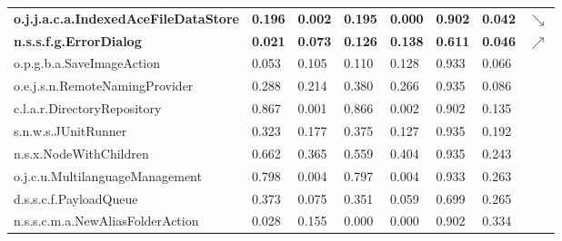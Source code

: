 \begin{tabular}{llllllll}
\multicolumn{1}{l|}{\textbf{o.j.j.a.c.a.IndexedAceFileDataStore}}           & \textbf{0.196} & \multicolumn{1}{l|}{\textbf{0.002}} & \textbf{0.195} & \multicolumn{1}{l|}{\textbf{0.000}} & \textbf{0.902} & \textbf{0.042} & $\searrow$\\
\multicolumn{1}{l|}{\textbf{n.s.s.f.g.ErrorDialog}}                         & \textbf{0.021} & \multicolumn{1}{l|}{\textbf{0.073}} & \textbf{0.126} & \multicolumn{1}{l|}{\textbf{0.138}} & \textbf{0.611} & \textbf{0.046} & $\nearrow$\\
\multicolumn{1}{l|}{o.p.g.b.a.SaveImageAction}                              & 0.053          & \multicolumn{1}{l|}{0.105}          & 0.110          & \multicolumn{1}{l|}{0.128}          & 0.933          & 0.066          & \\
\multicolumn{1}{l|}{o.e.j.s.n.RemoteNamingProvider}                         & 0.288          & \multicolumn{1}{l|}{0.214}          & 0.380          & \multicolumn{1}{l|}{0.266}          & 0.935          & 0.086          & \\
\multicolumn{1}{l|}{c.l.a.r.DirectoryRepository}                            & 0.867          & \multicolumn{1}{l|}{0.001}          & 0.866          & \multicolumn{1}{l|}{0.002}          & 0.902          & 0.135          & \\
\multicolumn{1}{l|}{s.n.w.s.JUnitRunner}                                    & 0.323          & \multicolumn{1}{l|}{0.177}          & 0.375          & \multicolumn{1}{l|}{0.127}          & 0.935          & 0.192          & \\
\multicolumn{1}{l|}{n.s.x.NodeWithChildren}                                 & 0.662          & \multicolumn{1}{l|}{0.365}          & 0.559          & \multicolumn{1}{l|}{0.404}          & 0.935          & 0.243          & \\
\multicolumn{1}{l|}{o.j.c.u.MultilanguageManagement}                        & 0.798          & \multicolumn{1}{l|}{0.004}          & 0.797          & \multicolumn{1}{l|}{0.004}          & 0.933          & 0.263          & \\
\multicolumn{1}{l|}{d.s.s.c.f.PayloadQueue}                                 & 0.373          & \multicolumn{1}{l|}{0.075}          & 0.351          & \multicolumn{1}{l|}{0.059}          & 0.699          & 0.265          & \\
\multicolumn{1}{l|}{n.s.s.c.m.a.NewAliasFolderAction}                       & 0.028          & \multicolumn{1}{l|}{0.155}          & 0.000          & \multicolumn{1}{l|}{0.000}          & 0.902          & 0.334          & \\

\end{tabular}

